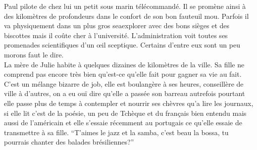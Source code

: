 Paul pilote de chez lui un petit sous marin télécommandé. Il se promène ainsi à
des kilomètres de profondeurs dans le confort de son bon fauteuil mou. Parfois
il va physiquement dans un plus gros seaexplorer avec des bons sièges et des
biscottes mais il coûte cher à l’université. L’administration voit toutes ses
promenades scientifiques d’un œil sceptique. Certains d’entre eux sont un peu
morons faut le dire.  \\
\clearpage
La mère de Julie habite à quelques dizaines de kilomètres de la ville. Sa fille
ne comprend pas encore très bien qu’est-ce qu’elle fait pour gagner sa vie au
fait. C’est un mélange bizarre de job, elle est boulangère à ses heures,
conseillère de ville à d’autres, on a eu ouï dire qu’elle a passée son barreau
autrefois pourtant elle passe plus de temps à contempler et nourrir ses chèvres
qu’a lire les journaux, si elle lit c’est de la poésie, un peu de Tchèque et du
français bien entendu mais aussi de l’américain et elle s’essaie récemment au
portugais ce qu’elle essaie de transmettre à sa fille. “T’aimes le jazz et la
samba, c’est beau la bossa, tu pourrais chanter des balades brésiliennes?”
\clearpage
